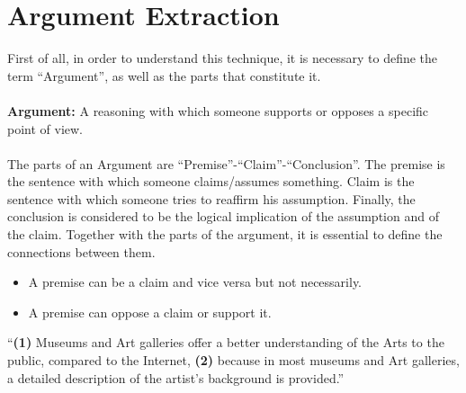 \section{Argument Extraction}
First of all, in order to understand this technique, it is necessary to define the term ``Argument'', as well as the parts that constitute it.\\
\\
\textbf{Argument:} A reasoning with which someone supports or opposes a specific point of view.\\
\\
The parts of an Argument are ``Premise''-``Claim''-``Conclusion''. The premise is the sentence with which someone claims/assumes something. Claim is the sentence with which someone tries to reaffirm his assumption. Finally, the conclusion is considered to be the logical implication of the assumption and of the claim. Together with the parts of the argument, it is essential to define the connections between them.\cite{(6)}\cite{(7)}\\
\begin{itemize}

	\item A premise can be a claim and vice versa but not necessarily.
	\item A premise can oppose a claim or support it.\\

\end{itemize}

\begin{example}
``\textbf{(1)} Museums and Art galleries offer a better understanding of the Arts to the public, compared to the Internet, \textbf{(2)} because in most museums and Art galleries, a detailed description of the artist's background is provided.''\\
\end{example}

